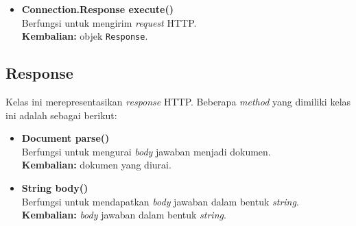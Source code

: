 \begin{itemize}
		
		\item \textbf{Connection.Response execute()} \\
		Berfungsi untuk mengirim \textit{request} HTTP.\\
		\textbf{Kembalian:} objek \texttt{Response}.	
\end{itemize}


\subsection{Response}
Kelas ini merepresentasikan \textit{response} HTTP. Beberapa \textit{method} yang dimiliki kelas ini adalah sebagai berikut:
\begin{itemize}
		
		\item \textbf{Document parse()} \\
		Berfungsi untuk mengurai \textit{body} jawaban menjadi dokumen. \\
		\textbf{Kembalian:} dokumen yang diurai.
		
		\item \textbf{String body()} \\
		Berfungsi untuk mendapatkan \textit{body} jawaban dalam bentuk \textit{string}. \\
		\textbf{Kembalian:} \textit{body} jawaban dalam bentuk \textit{string}.
\end{itemize}


